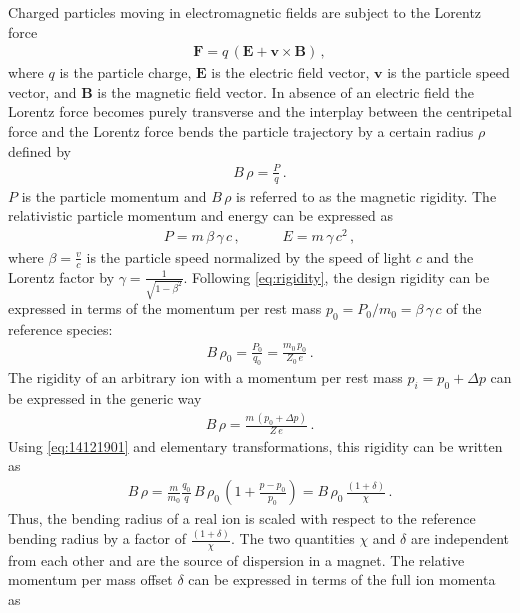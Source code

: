 Charged particles moving in electromagnetic fields are subject to the Lorentz force~\cite{griffiths13}
\begin{align}
\mathbf{F} = q \, ( \mathbf{E} + \mathbf{v} \times \mathbf{B} ) \, ,
\end{align} 
where $q$ is the particle charge, $\mathbf{E}$ is the electric field vector, $\mathbf{v}$ is the particle speed vector, and $\mathbf{B}$ is the magnetic field vector. In absence of an electric field the Lorentz force becomes purely transverse and the interplay between the centripetal force and the Lorentz force bends the particle trajectory by a certain radius $\rho$ defined by~\cite{wiedemann1999particle}
\begin{align}
B \, \rho = \frac{P}{q} \, . \label{eq:rigidity}
\end{align}  
$P$ is the particle momentum and $B \, \rho$ is referred to as the magnetic rigidity. The relativistic particle momentum and energy can be expressed as
\begin{align}
P = m \, \beta \, \gamma \, c \, , \quad \quad \quad E = m \, \gamma \, c^2 \, ,
\end{align}
where $\beta=\frac{v}{c}$ is the particle speed normalized by the speed of light $c$ and the Lorentz factor by $\gamma = \frac{1}{\sqrt{1-\beta^2}}$. Following \eqref{eq:rigidity}, the design rigidity can be expressed  in terms of the momentum per rest mass $p_0=P_0/m_0 = \beta \, \gamma \, c$ of the reference species:
\begin{align}
B \, \rho_0 = \frac{P_0}{q_0} = \frac{m_0 \, p_0}{Z_0 \, e} \, . \label{eq:14121901}
\end{align}
 The rigidity of an arbitrary ion with a momentum per rest mass $p_i = p_0 + \Delta p$ can be expressed in the generic way
\begin{align}
B\,\rho = \frac{m \, (p_0 + \Delta p)}{Z \, e} \, .
\end{align} 
Using \eqref{eq:14121901} and elementary transformations, this rigidity can be written as
\begin{align}
B \, \rho = \frac{m}{m_0} \frac{q_0}{q} \, B \, \rho_0 \, \left( 1 + \frac{p - p_0}{p_0} \right) =  B \, \rho_0 \, \frac{\left( 1 + \delta \right)}{\chi}  \, . \label{eq:15080401}
\end{align}
Thus, the bending radius of a real ion is scaled with respect to the reference bending radius by a factor of $\frac{(1+\delta)}{\chi}$. The two quantities $\chi$ and $\delta$ are independent from each other and are the source of dispersion in a magnet. The relative momentum per mass offset $\delta$ can be expressed in terms of the full ion momenta as
